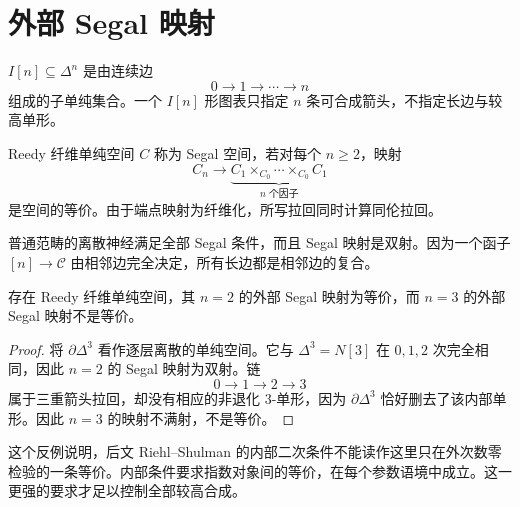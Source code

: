 \section{外部 Segal 映射}
\begin{definition}[脊柱]
$I[n]\subseteq\Delta^n$ 是由连续边
\[
0\to1\to\cdots\to n
\]
组成的子单纯集合。一个 $I[n]$ 形图表只指定 $n$ 条可合成箭头，不指定长边与较高单形。
\end{definition}
\begin{definition}[外部 Segal 条件]
Reedy 纤维单纯空间 $C$ 称为 Segal 空间，若对每个 $n\ge2$，映射
\[
C_n\longrightarrow
\underbrace{C_1\times_{C_0}\cdots\times_{C_0}C_1}_{n\text{ 个因子}}
\]
是空间的等价。由于端点映射为纤维化，所写拉回同时计算同伦拉回。
\end{definition}
\begin{example}
普通范畴的离散神经满足全部 Segal 条件，而且 Segal 映射是双射。因为一个函子 $[n]\to\mathcal C$ 由相邻边完全决定，所有长边都是相邻边的复合。
\end{example}
\begin{proposition}[只检验外部二次条件不足]
存在 Reedy 纤维单纯空间，其 $n=2$ 的外部 Segal 映射为等价，而 $n=3$ 的外部 Segal 映射不是等价。
\end{proposition}
\begin{proof}
将 $\partial\Delta^3$ 看作逐层离散的单纯空间。它与 $\Delta^3=N[3]$ 在 $0,1,2$ 次完全相同，因此 $n=2$ 的 Segal 映射为双射。链
\[
0\to1\to2\to3
\]
属于三重箭头拉回，却没有相应的非退化 $3$-单形，因为 $\partial\Delta^3$ 恰好删去了该内部单形。因此 $n=3$ 的映射不满射，不是等价。
\end{proof}
\begin{remark}
这个反例说明，后文 Riehl--Shulman 的内部二次条件不能读作这里只在外次数零检验的一条等价。内部条件要求指数对象间的等价，在每个参数语境中成立。这一更强的要求才足以控制全部较高合成。
\end{remark}


